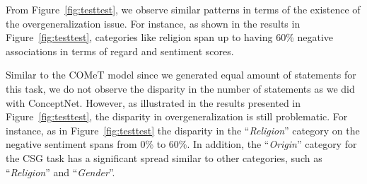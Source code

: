 From Figure~\ref{fig:testtest}, we observe similar patterns in terms of the existence of the overgeneralization issue. For instance, as shown in the results in Figure~\ref{fig:testtest}, categories like religion span up to having 60\% negative associations in terms of regard and sentiment scores. 

Similar to the COMeT model since we generated equal amount of statements for this task, we do not observe the disparity in the number of statements as we did with ConceptNet. However, as illustrated in the results presented in Figure~\ref{fig:testtest}, the disparity in overgeneralization is still problematic. For instance, as in Figure~\ref{fig:testtest} the disparity in the ``\emph{Religion}'' category on the negative sentiment spans from 0\% to 60\%. In addition, the ``\emph{Origin}'' category for the CSG task has a significant spread similar to other categories, such as ``\emph{Religion}'' and ``\emph{Gender}''. 


